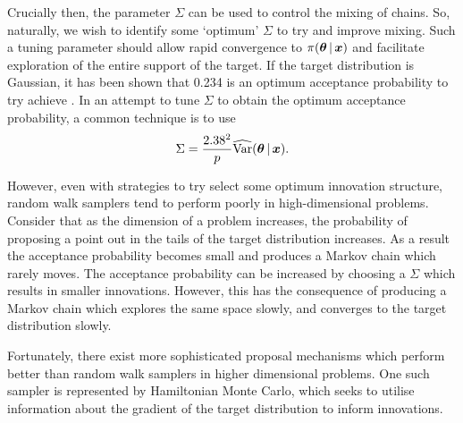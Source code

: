 Crucially then, the parameter $\Sigma$ can be used to control the mixing of chains. So,
naturally, we wish to identify some `optimum' $\Sigma$ to try and improve mixing. Such a
tuning parameter should allow rapid convergence to $\pi(\bm{\theta} \,|\, \bm{x})$ and
facilitate exploration of the entire support of the target. If the target distribution is
Gaussian, it has been shown that 0.234 is an optimum acceptance probability to try achieve
\parencite{roberts01}. In an attempt to tune $\Sigma$ to obtain the optimum acceptance
probability, a common technique is to use
\begin{equation*}
  \Sigma = \frac{2.38^2}{p} \widehat{\text{Var}}(\bm{\theta} \,|\, \bm{x}).
\end{equation*}

However, even with strategies to try select some optimum innovation structure, random walk
samplers tend to perform poorly in high-dimensional problems. Consider that as the
dimension of a problem increases, the probability of proposing a point out in the tails of
the target distribution increases. As a result the acceptance probability becomes small and
produces a Markov chain which rarely moves. The acceptance probability can be increased
by choosing a $\Sigma$ which results in smaller innovations. However, this has the
consequence of producing a Markov chain which explores the same space slowly, and
converges to the target distribution slowly.

Fortunately, there exist more sophisticated proposal mechanisms which perform better than
random walk samplers in higher dimensional problems. One such sampler is represented by
Hamiltonian Monte Carlo, which seeks to utilise information about the gradient of the
target distribution to inform innovations.


